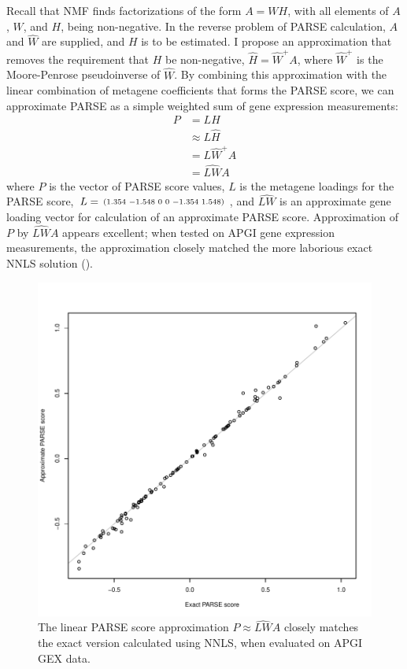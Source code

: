 Recall that \gls{NMF} finds factorizations of the form $A = W H$, with all elements of $A$, $W$, and $H$, being non-negative.  In the reverse problem of \gls{PARSE} calculation, $A$ and $\widehat{W}$ are supplied, and $H$ is to be estimated.  I propose an approximation that removes the requirement that $H$ be non-negative, $\widehat{H} = \widehat{W}^+ A$, where $\widehat{W}^+$ is the Moore-Penrose pseudoinverse of $\widehat{W}$.  By combining this approximation with the linear combination of metagene coefficients that forms the \gls{PARSE} score, we can approximate \gls{PARSE} as a simple weighted sum of gene expression measurements:
\begin{align}
  P &= L H \\
    &\approx L \widehat{H} \\
    &= L \widehat{W}^+ A \\
    &= \widehat{LW} A
\end{align}
where $P$ is the vector of \gls{PARSE} score values, $L$ is the metagene loadings for the \gls{PARSE} score, $L = \begin{smallmatrix}(1.354&-1.548&0&0&-1.354&1.548)\end{smallmatrix}$, and $\widehat{LW}$ is an approximate gene loading vector for calculation of an approximate \gls{PARSE} score.  Approximation of $P$ by $\widehat{LW} A$ appears excellent; when tested on \gls{APGI} gene expression measurements, the approximation closely matched the more laborious exact \gls{NNLS} solution ().

\begin{figure}
\centering
\includegraphics[width=.7\linewidth]{analysis/biosurv/reports/18_SIS_diag_dsd_final/figure/approx-calc-1}
\caption[Performance of the \acrshort{PARSE} score approximation]{The linear \acrshort{PARSE} score approximation $P \approx \widehat{LW} A$ closely matches the exact version calculated using \gls{NNLS}, when evaluated on \gls{APGI} \gls{GEX} data.}\label{fig:app-parse-approx-matching}
\end{figure}

